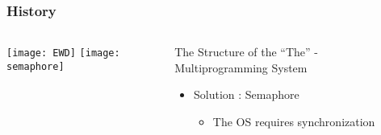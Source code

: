 \begin{frame}[plain]
	\frametitle{History}
	
	
	
	\begin{columns}
		
		\begin{column}{.4\textwidth}
			\centering
			\texttt{[image: EWD]}
			\texttt{[image: semaphore]}
			
			
			
		\end{column}
		
		\begin{column}{.6\textwidth}
			
			The Structure of the “The” - Multiprogramming System
			\begin{itemize}
				\item Solution : Semaphore
				
				\begin{itemize}
					\item The OS requires synchronization

				\end{itemize}
				
			\end{itemize}	
			
		\end{column}
		
		
	\end{columns}
	
	
\end{frame}


